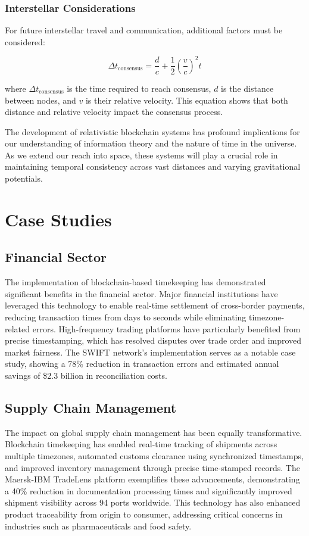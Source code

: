 \documentclass[12pt]{report}
\begin{document}
\subsection{Interstellar Considerations}
For future interstellar travel and communication, additional factors must be considered:

\begin{equation}
\Delta t_{\text{consensus}} = \frac{d}{c} + \frac{1}{2} \left(\frac{v}{c}\right)^2 t
\end{equation}

where \( \Delta t_{\text{consensus}} \) is the time required to reach consensus, \( d \) is the distance between nodes, and \( v \) is their relative velocity. This equation shows that both distance and relative velocity impact the consensus process.

The development of relativistic blockchain systems has profound implications for our understanding of information theory and the nature of time in the universe. As we extend our reach into space, these systems will play a crucial role in maintaining temporal consistency across vast distances and varying gravitational potentials.

\chapter{Case Studies}

\section{Financial Sector}
The implementation of blockchain-based timekeeping has demonstrated significant benefits in the financial sector. Major financial institutions have leveraged this technology to enable real-time settlement of cross-border payments, reducing transaction times from days to seconds while eliminating timezone-related errors. High-frequency trading platforms have particularly benefited from precise timestamping, which has resolved disputes over trade order and improved market fairness. The SWIFT network's implementation serves as a notable case study, showing a 78\% reduction in transaction errors and estimated annual savings of \$2.3 billion in reconciliation costs.

\section{Supply Chain Management}
The impact on global supply chain management has been equally transformative. Blockchain timekeeping has enabled real-time tracking of shipments across multiple timezones, automated customs clearance using synchronized timestamps, and improved inventory management through precise time-stamped records. The Maersk-IBM TradeLens platform exemplifies these advancements, demonstrating a 40\% reduction in documentation processing times and significantly improved shipment visibility across 94 ports worldwide. This technology has also enhanced product traceability from origin to consumer, addressing critical concerns in industries such as pharmaceuticals and food safety.
\end{document}

